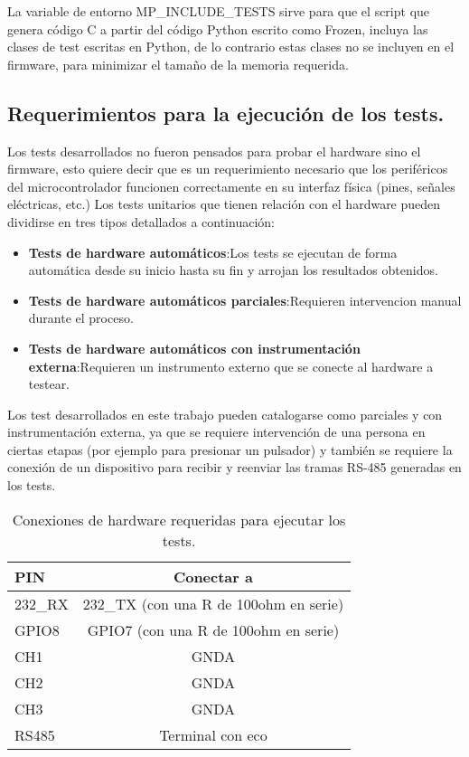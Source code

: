 La variable de entorno MP\_INCLUDE\_TESTS sirve para que el script que genera código C a partir del código Python escrito como Frozen, incluya las clases de test escritas en Python, de lo contrario estas clases no se incluyen en el firmware, para minimizar el tamaño de la memoria requerida.

\subsection{Requerimientos para la ejecución de los tests.}
\label{sec:requerimientosEjecucionTests}

Los tests desarrollados no fueron pensados para probar el hardware sino el firmware, esto quiere decir que es un requerimiento necesario que los periféricos del microcontrolador funcionen correctamente en su interfaz física (pines, señales eléctricas, etc.)
Los tests unitarios que tienen relación con el hardware pueden dividirse en tres tipos\cite{tdd} detallados a continuación:

\begin{itemize}
	\item \textbf{Tests de hardware automáticos}:Los tests se ejecutan de forma automática desde su inicio hasta su fin y arrojan los resultados obtenidos.
	\item \textbf{Tests de hardware automáticos parciales}:Requieren intervencion manual durante el proceso.
	\item \textbf{Tests de hardware automáticos con instrumentación externa}:Requieren un instrumento externo que se conecte al hardware a testear.
\end{itemize}

Los test desarrollados en este trabajo pueden catalogarse como parciales y con instrumentación externa, ya que se requiere intervención de una persona en ciertas etapas (por ejemplo para presionar un pulsador) y también se requiere la conexión de un dispositivo para recibir y reenviar las tramas RS-485 generadas en los tests.

\begin{table}[h]
	\centering
	\caption[]{Conexiones de hardware requeridas para ejecutar los tests.}
	\begin{tabular}{l c}    
		\toprule
		\textbf{PIN} 	 	& \textbf{Conectar a}   									\\
		\midrule
		232\_RX	 				& 232\_TX (con una R de 100ohm en serie)		\\	
		GPIO8	 					& GPIO7 (con una R de 100ohm en serie)		\\		
		CH1	 						& GNDA																		\\		
		CH2	 						& GNDA																		\\		
		CH3	 						& GNDA																		\\		
		RS485						& Terminal con eco												\\
		\bottomrule
		\hline
	\end{tabular}
	\label{tab:hardreq}
\end{table}


